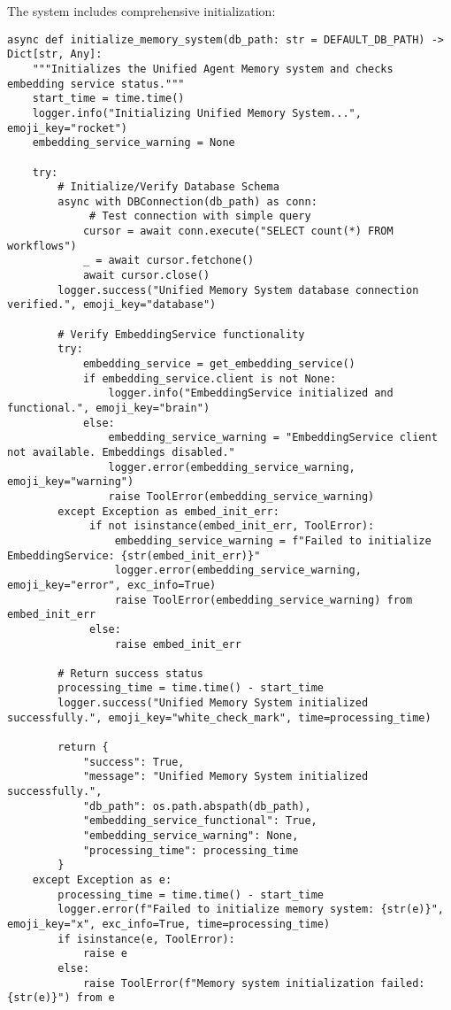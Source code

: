 \documentclass[12pt,a4paper]{article}
\begin{document}
The system includes comprehensive initialization:
\begin{pageablecode}
\begin{verbatim}
async def initialize_memory_system(db_path: str = DEFAULT_DB_PATH) -> Dict[str, Any]:
    """Initializes the Unified Agent Memory system and checks embedding service status."""
    start_time = time.time()
    logger.info("Initializing Unified Memory System...", emoji_key="rocket")
    embedding_service_warning = None

    try:
        # Initialize/Verify Database Schema
        async with DBConnection(db_path) as conn:
             # Test connection with simple query
            cursor = await conn.execute("SELECT count(*) FROM workflows")
            _ = await cursor.fetchone()
            await cursor.close()
        logger.success("Unified Memory System database connection verified.", emoji_key="database")

        # Verify EmbeddingService functionality
        try:
            embedding_service = get_embedding_service()
            if embedding_service.client is not None:
                logger.info("EmbeddingService initialized and functional.", emoji_key="brain")
            else:
                embedding_service_warning = "EmbeddingService client not available. Embeddings disabled."
                logger.error(embedding_service_warning, emoji_key="warning")
                raise ToolError(embedding_service_warning)
        except Exception as embed_init_err:
             if not isinstance(embed_init_err, ToolError):
                 embedding_service_warning = f"Failed to initialize EmbeddingService: {str(embed_init_err)}"
                 logger.error(embedding_service_warning, emoji_key="error", exc_info=True)
                 raise ToolError(embedding_service_warning) from embed_init_err
             else:
                 raise embed_init_err

        # Return success status
        processing_time = time.time() - start_time
        logger.success("Unified Memory System initialized successfully.", emoji_key="white_check_mark", time=processing_time)

        return {
            "success": True,
            "message": "Unified Memory System initialized successfully.",
            "db_path": os.path.abspath(db_path),
            "embedding_service_functional": True,
            "embedding_service_warning": None,
            "processing_time": processing_time
        }
    except Exception as e:
        processing_time = time.time() - start_time
        logger.error(f"Failed to initialize memory system: {str(e)}", emoji_key="x", exc_info=True, time=processing_time)
        if isinstance(e, ToolError):
            raise e
        else:
            raise ToolError(f"Memory system initialization failed: {str(e)}") from e
\end{verbatim}
\end{pageablecode}
\end{document}
